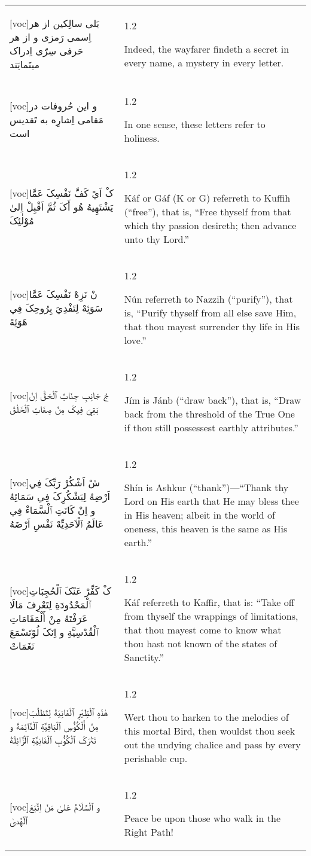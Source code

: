 \documentclass[11pt]{article}
\makeatletter
\newenvironment{orig}
  {\begin{farsi}[voc]}
  {\end{farsi}}
\newenvironment{trans}
  {\large\begin{spacing}{1.2}\raggedright}
  {\end{spacing}}
\newenvironment{word}
  {\begin{longtable}[t]{p{3in}@{\hspace{3em}}p{2.5in}}}
  {\end{longtable}}
\newcommand{\ayat}[2]{
  \begin{orig}#1\end{orig} &
  \vspace{1.5ex}\begin{trans}#2\end{trans} \vspace{-2ex}\\
}
\makeatother
\begin{document}
\begin{word}
\ayat{بَلی سالِکين از هر اِسمی رَمزی و از هر حَرفی سِرّی اِدراک مينَمايَند}
     {Indeed, the wayfarer findeth a secret in every name, a mystery in every
      letter.}

\ayat{و اين حُروفات در مَقامی اِشارِه به تَقديس است}
     {In one sense, these letters refer to holiness.}

\ayat{کْ اَيْ کَفَّ نَفْسِکَ عَمَّا يَشْتَهِيهُ هُو أَکَ ثُمَّ اَقْبِلْ اِلىٰ مُوْلٰئِکَ}
     {Káf or Gáf (K or G) referreth to Kuffih (“free”), that is, “Free thyself
      from that which thy passion desireth; then advance unto thy Lord.”}

\ayat{نْ نَزِهْ نَفْسِکَ عَمَّا سَوَئِهْ لِتَفْدِيَ بِرُوحِکَ فِي هَوَئِهْ}
     {Nún referreth to Nazzih (“purify”), that is, “Purify thyself from all
      else save Him, that thou mayest surrender thy life in His love.”}

\ayat{جْ جَانِبِ جِنَابُ ٱلْحَقّْ اِنْ بَقِيَ فِيکَ مِنْ صِفَاتِ ٱلْخَلْقْ}
     {Jím is Jánb (“draw back”), that is, “Draw back from the threshold of the
      True One if thou still possessest earthly attributes.”}

\ayat{شْ اَشْکُرْ رَبِّکَ فِي اَرْضِهُ لِيَشْکُرِکَ فِي سَمَائِهُ و اِنْ کَانَتِ ٱلْسَّمَاءْ فِي عَالَمُ ٱلْاَحَدِيِّهْ نَفْسِ اَرْضَهُ}
     {Shín is Ashkur (“thank”)—“Thank thy Lord on His earth that He may bless
      thee in His heaven; albeit in the world of oneness, this heaven is the
      same as His earth.”}

\ayat{کْ کَفِّرْ عَنْکَ ٱلْحُجِبَاتِ ٱلْمَحْدُودَةِ لِتَعْرِفَ مَالَا عَرَفْتَهُ مِنْ أَلْمَقَامَاتِ ٱلْقُدْسِيَّةِ و اِنَکَ لُوْتَسْمَعَ نَغَمَاتْ}
     {Káf referreth to Kaffir, that is: “Take off from thyself the wrappings
      of limitations, that thou mayest come to know what thou hast not known
      of the states of Sanctity.”}

\ayat{هٰذَهِ ٱلْطِّيْرِ ٱلْفَانِيَةْ لِتَطْلُبَ مِنْ أَلْکُؤُسِ ٱلْبَاقِيَّةِ ٱلْدَّائِمَةْ و تَتْرَکَ ٱلْکُؤُبِ ٱلْفَانِيَّةِ ٱلْزَّائِلَةْ}
     {Wert thou to harken to the melodies of this mortal Bird, then wouldst
      thou seek out the undying chalice and pass by every perishable cup.}

\ayat{و ٱلْسَّلَامُ عَلىٰ مَنْ اِتَّبَعَ ٱلْهُدىٰ}
     {Peace be upon those who walk in the Right Path!}
\end{word}
\end{document}
